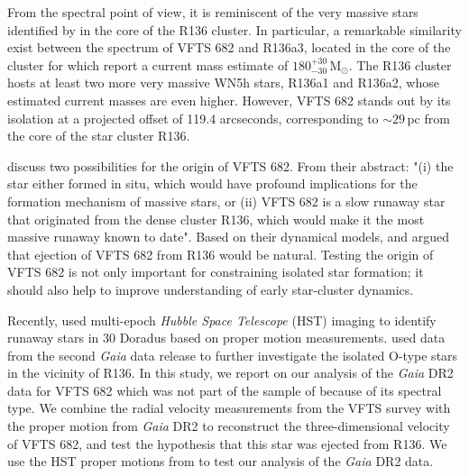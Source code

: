 \documentclass[apjl,twocolumn]{emulateapj}
\newcommand{\Msun}{{\,\mathrm{M}_\odot}}
\begin{document}
From the spectral point of view, it is reminiscent of the very
massive stars %
identified by
\citet{dekoter:97,crowther:10, crowther:16} in the core of the
R136 cluster. In particular, a remarkable similarity exist between the
spectrum of VFTS 682 and R136a3, located in the core of the cluster
\citep{crowther:10} for which \citet{crowther:16} report a
current mass estimate of $180^{+30}_{-30}\Msun$. The R136 cluster hosts
at least two more very massive WN5h stars, R136a1 and R136a2, whose
estimated current masses are even higher. However, VFTS 682 stands
out by its isolation at a projected offset of 119.4 arcseconds, corresponding to $\sim$$29$\,pc from the core of the star cluster
R136.

\citet{bestenlehner:11} discuss two possibilities for the
origin of VFTS 682. %
From their abstract: "(i) the
star either formed in situ, which would have profound implications for
the formation mechanism of massive stars, or (ii) VFTS 682 is a slow
runaway star that originated from the dense cluster R136, which would
make it the most massive runaway known to date". Based on their
dynamical models, \citet{fujii:11} and \citet{banerjee:12} argued that
ejection of VFTS 682 from R136 would be natural. Testing the origin of
VFTS 682 is not only important for constraining isolated star
formation; it should also help to improve understanding of early star-cluster dynamics.

Recently, \citet{platais:15,platais:18} used multi-epoch \emph{Hubble Space
  Telescope} (HST) imaging to identify %
runaway stars in
 30 Doradus based on proper motion
measurements. \citet{lennon:18} used data from the second \emph{Gaia}
data release \cite[DR2,][]{gaia:16,brown:18} to further investigate
the isolated O-type stars in the vicinity of R136. In this study, we
report on our analysis of the \emph{Gaia} DR2 data for VFTS 682 which
was not part of the sample of \citet{lennon:18} because of its 
spectral type. We combine the radial velocity measurements from the
VFTS survey \citep[][]{evans:11} with the proper motion from
\emph{Gaia} DR2 to reconstruct the three-dimensional velocity of VFTS
682, and test the hypothesis that this star was ejected from R136. We
use the HST proper motions from \citet{platais:18} to test our
analysis of the \emph{Gaia} DR2 data.

\end{document}
